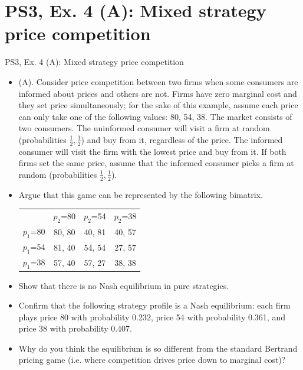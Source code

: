 \section{PS3, Ex. 4 (A): Mixed strategy price competition}

\begin{frame}{PS3, Ex. 4 (A): Mixed strategy price competition}
    \begin{itemize}
      \item[4.] (A). Consider price competition between two firms when some consumers are informed about prices and others are not. Firms have zero marginal cost and they set price simultaneously; for the sake of this example, assume each price can only take one of the following values: 80, 54, 38. The market consists of two consumers. The uninformed consumer will visit a firm at random (probabilities $\frac{1}{2},\frac{1}{2}$) and buy from it, regardless of the price. The informed consumer will visit the firm with the lowest price and buy from it. If both firms set the same price, assume that the informed consumer picks a firm at random (probabilities $\frac{1}{2},\frac{1}{2}$).
      \item[(a)] Argue that this game can be represented by the following bimatrix.
      \vspace{-4pt}
      \begin{table}
        \begin{tabular}{c|c|c|c|}
          \multicolumn{1}{c}{} & \multicolumn{1}{c}{$p_2$=80} & \multicolumn{1}{c}{$p_2$=54} & \multicolumn{1}{c}{$p_2$=38} \\\cline{2-4}
          $p_1$=80 & 80, 80 & 40, 81 & 40, 57 \\\cline{2-4}
          $p_1$=54 & 81, 40 & 54, 54 & 27, 57 \\\cline{2-4}
          $p_1$=38 & 57, 40 & 57, 27 & 38, 38 \\\cline{2-4}
        \end{tabular}
      \end{table}
      \item[(b)] Show that there is no Nash equilibrium in pure strategies.
      \item[(c)] Confirm that the following strategy profile is a Nash equilibrium: each firm plays price 80 with probability 0.232, price 54 with probability 0.361, and price 38 with probability 0.407.
      \item[(d)] Why do you think the equilibrium is so different from the standard Bertrand pricing game (i.e. where competition drives price down to marginal cost)?
    \end{itemize}
\end{frame}
